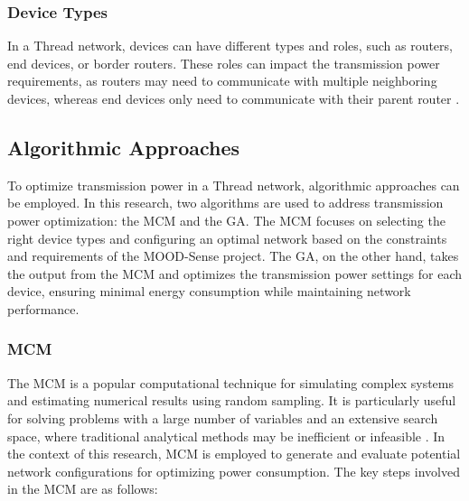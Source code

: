 \subsubsection{Device Types}

In a Thread network, devices can have different types and roles, such as routers, end devices, or border routers. These roles can impact the transmission power requirements, as routers may need to communicate with multiple neighboring devices, whereas end devices only need to communicate with their parent router \cite{Thread_Group_Fundamentals}.

\subsection{Algorithmic Approaches}

To optimize transmission power in a Thread network, algorithmic approaches can be employed. In this research, two algorithms are used to address transmission power optimization: the \gls{MCM} and the \gls{GA}. The \gls{MCM} focuses on selecting the right device types and configuring an optimal network based on the constraints and requirements of the MOOD-Sense project. The \gls{GA}, on the other hand, takes the output from the \gls{MCM} and optimizes the transmission power settings for each device, ensuring minimal energy consumption while maintaining network performance.

\subsubsection{\acrlong{MCM}}

The \acrfull{MCM} is a popular computational technique for simulating complex systems and estimating numerical results using random sampling. It is particularly useful for solving problems with a large number of variables and an extensive search space, where traditional analytical methods may be inefficient or infeasible \cite{kroese2014monte}. In the context of this research, \gls{MCM} is employed to generate and evaluate potential network configurations for optimizing power consumption. The key steps involved in the \gls{MCM} are as follows:

